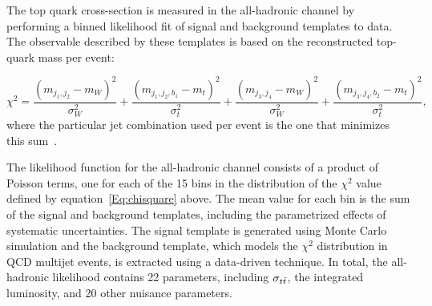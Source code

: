 The top quark cross-section is measured in the all-hadronic channel by performing a binned likelihood fit of signal and background templates to data.
The observable described by these templates is based on the reconstructed top-quark mass per event:

\begin{equation}\label{Eq:chisquare}
  \chi^2 =  \frac{ \left(m_{j_1, j_2} - m_{W}\right)^2}{\sigma_W^2} + \frac{ \left(m_{j_1, j_2, b_1} - m_{t}\right)^2}{\sigma_t^2} + \frac{ \left(m_{j_3, j_4} - m_{W}\right)^2}{\sigma_W^2} + \frac{ \left(m_{j_3, j_4, b_2} - m_{t}\right)^2}{\sigma_t^2},
  \end{equation}
where the particular jet combination used per event is the one that minimizes this sum~\cite{ALL_HADRONIC_NODE}.

The likelihood function for the all-hadronic channel consists of a product of Poisson terms, 
one for each of the 15 bins in the distribution of the $\chi^2$ value defined by equation~\ref{Eq:chisquare} above. 
The mean value for each bin is the sum of the signal and background templates, including the parametrized effects of systematic uncertainties.
The signal template is generated using Monte Carlo simulation and the background template, which models the $\chi^2$ distribution in QCD multijet events, is extracted using a data-driven technique.
In total, the all-hadronic likelihood contains 22 parameters, including $\sigma_{t\bar{t}}$, the integrated luminosity, and 20 other nuisance parameters.

